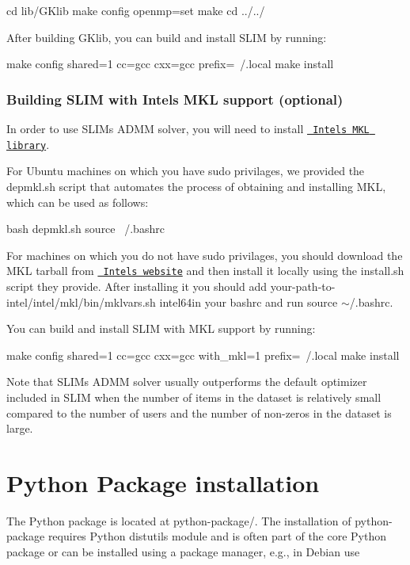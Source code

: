 \begin{DoxyVerb}cd lib/GKlib
make config openmp=set
make
cd ../../
\end{DoxyVerb}


After building G\+Klib, you can build and install S\+L\+IM by running\+:

\begin{DoxyVerb}make config shared=1 cc=gcc cxx=gcc prefix=~/.local
make install
\end{DoxyVerb}
\hypertarget{index_mkl_build}{}\subsubsection{Building S\+L\+I\+M with Intel\textquotesingle{}s M\+K\+L support (optional)}\label{index_mkl_build}
In order to use S\+L\+IM\textquotesingle{}s A\+D\+MM solver, you will need to install \href{https://software.intel.com/en-us/mkl}{\texttt{ Intel\textquotesingle{}s M\+KL library}}.

For Ubuntu machines on which you have {\ttfamily sudo} privilages, we provided the {\ttfamily depmkl.\+sh} script that automates the process of obtaining and installing M\+KL, which can be used as follows\+:

\begin{DoxyVerb}bash depmkl.sh
source ~/.bashrc 
\end{DoxyVerb}


For machines on which you do not have {\ttfamily sudo} privilages, you should download the M\+KL tarball from \href{https://software.intel.com/en-us/mkl}{\texttt{ Intel\textquotesingle{}s website}} and then install it locally using the {\ttfamily install.\+sh} script they provide. After installing it you should add {\ttfamily your-\/path-\/to-\/intel/intel/mkl/bin/mklvars.\+sh intel64}in your bashrc and run {\ttfamily source $\sim$/.bashrc}.

You can build and install S\+L\+IM with M\+KL support by running\+:

\begin{DoxyVerb}make config shared=1 cc=gcc cxx=gcc with_mkl=1 prefix=~/.local
make install
\end{DoxyVerb}


Note that S\+L\+IM\textquotesingle{}s A\+D\+MM solver usually outperforms the default optimizer included in S\+L\+IM when the number of items in the dataset is relatively small compared to the number of users and the number of non-\/zeros in the dataset is large.\hypertarget{index_pythonpackage}{}\section{Python Package installation}\label{index_pythonpackage}
The Python package is located at {\ttfamily python-\/package/}. The installation of python-\/package requires Python {\ttfamily distutils} module and is often part of the core Python package or can be installed using a package manager, e.\+g., in Debian use

